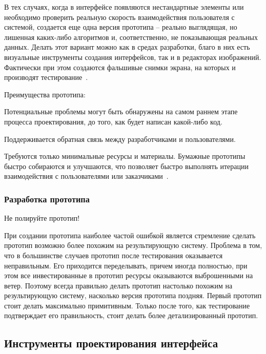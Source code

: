 \documentclass{../industrial-development}
\begin{document}
В тех случаях, когда в интерфейсе появляются нестандартные элементы или необходимо проверить реальную скорость взаимодействия пользователя с системой, создается еще одна версия прототипа – реально выглядящая, но лишенная каких-либо алгоритмов и, соответственно, не показывающая реальных данных. Делать этот вариант можно как в средах разработки, благо в них есть визуальные инструменты создания интерфейсов, так и в редакторах изображений. Фактически при этом создаются фальшивые снимки экрана, на которых и производят тестирование~\cite[с.~128--130]{Golovach}.

Преимущества прототипа:

Потенциальные проблемы могут быть обнаружены на самом раннем этапе процесса проектирования, до того, как будет написан какой-либо код.

Поддерживается обратная связь между разработчиками и пользователями.
    
Требуются только минимальные ресурсы и материалы. Бумажные прототипы быстро собираются и улучшаются, что позволяет быстро выполнять итерации взаимодействия с пользователями или заказчиками~\cite{Usabilitynet-prototyping}.

\begin{frame} \frametitle{Разработка прототипа}
  \begin{block}{}
   \alert{Не полируйте прототип!}
  \end{block}
\end{frame}

\lecturenotes

При создании прототипа наиболее частой ошибкой является стремление сделать прототип возможно более похожим на результирующую систему. Проблема в том, что в большинстве случаев прототип после тестирования оказывается неправильным. Его приходится переделывать, причем иногда полностью, при этом все инвестированные в прототип ресурсы оказываются выброшенными на ветер. Поэтому всегда правильно делать прототип настолько похожим на результирующую систему, насколько версия прототипа поздняя. Первый прототип стоит делать максимально примитивным. Только после того, как тестирование подтверждает его правильность, стоит делать более детализированный прототип.

\subsection{Инструменты проектирования интерфейса}
\end{document}
